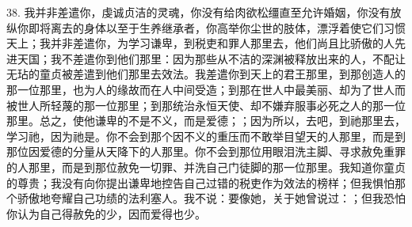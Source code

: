 38. 我并非差遣你，虔诚贞洁的灵魂，你没有给肉欲松缰直至允许婚姻，你没有放纵你即将离去的身体以至于生养继承者，你高举你尘世的肢体，漂浮着使它们习惯天上；我并非差遣你，为学习谦卑，到税吏和罪人那里去，他们尚且比骄傲的人先进天国；我不差遣你到他们那里：因为那些从不洁的深渊被释放出来的人，不配让无玷的童贞被差遣到他们那里去效法。我差遣你到天上的君王那里，到那创造人的那一位那里，也为人的缘故而在人中间受造；到那在世人中最美丽、却为了世人而被世人所轻蔑的那一位那里；到那统治永恒天使、却不嫌弃服事必死之人的那一位那里。总之，使他谦卑的不是不义，而是爱德；；因为所以，去吧，到祂那里去，学习祂，因为祂是。你不会到那个因不义的重压而不敢举目望天的人那里，而是到那位因爱德的分量从天降下的人那里。你不会到那位用眼泪洗主脚、寻求赦免重罪的人那里，而是到那位赦免一切罪、并洗自己门徒脚的那一位那里。我知道你童贞的尊贵；我没有向你提出谦卑地控告自己过错的税吏作为效法的榜样；但我惧怕那个骄傲地夸耀自己功绩的法利塞人。我不说：要像她，关于她曾说过：；但我恐怕你认为自己得赦免的少，因而爱得也少。\par


